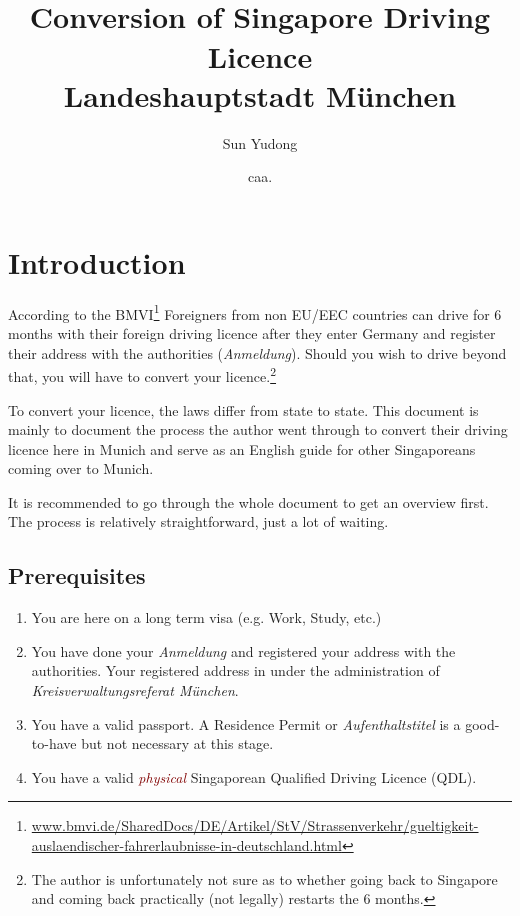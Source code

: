 \documentclass{article}
\title{\vspace{-1cm}{\large Unofficial Guide}\\Conversion of Singapore Driving Licence \\ {\large Landeshauptstadt München}}
\author{Sun Yudong}
\date{{\normalsize caa.} \datum}
\newcommand{\de}[1]{\textcolor{NavyBlue}{\textit{#1}}}
\newcommand{\impt}[1]{\textcolor{Maroon}{#1}}
\begin{document}
\maketitle

\section{Introduction}
    According to the BMVI\footnote{\scriptsize \url{www.bmvi.de/SharedDocs/DE/Artikel/StV/Strassenverkehr/gueltigkeit-auslaendischer-fahrerlaubnisse-in-deutschland.html}} Foreigners from non EU/EEC countries can drive for 6 months with their foreign driving licence after they enter Germany and register their address with the authorities (\de{Anmeldung}). Should you wish to drive beyond that, you will have to convert your licence.\footnote{The author is unfortunately not sure as to whether going back to Singapore and coming back practically (not legally) restarts the 6 months.}
    
    To convert your licence, the laws differ from state to state. This document is mainly to document the process the author went through to convert their driving licence here in Munich and serve as an English guide for other Singaporeans coming over to Munich. 
    
    It is recommended to go through the whole document to get an overview first. The process is relatively straightforward, just a lot of waiting.
    
        \subsection{Prerequisites}
        \begin{enumerate}
            \item You are here on a long term visa (e.g. Work, Study, etc.)
            \item You have done your \de{Anmeldung} and registered your address with the authorities. Your registered address in under the administration of \de{Kreisverwaltungsreferat München}. 
            \item You have a valid passport. A Residence Permit or \de{Aufenthaltstitel} is a good-to-have but not necessary at this stage. 
            \item You have a valid \impt{\textit{physical}} Singaporean Qualified Driving Licence (QDL).
        \end{enumerate}
        
\end{document}
